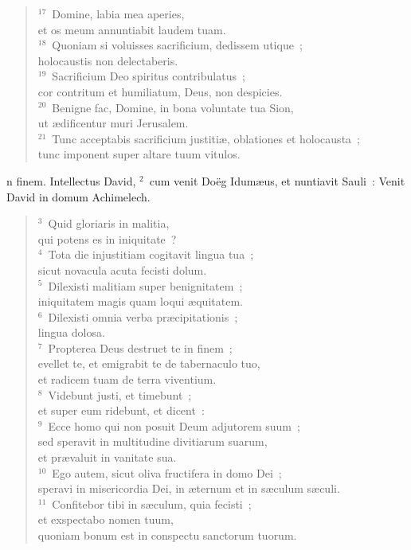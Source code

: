 \begin{verse}
${}^{17}$~Domine, labia mea aperies,\\ et os meum annuntiabit laudem tuam.\\
${}^{18}$~Quoniam si voluisses sacrificium, dedissem utique~;\\ holocaustis non delectaberis.\\
${}^{19}$~Sacrificium Deo spiritus contribulatus~;\\ cor contritum et humiliatum, Deus, non despicies.\\
${}^{20}$~Benigne fac, Domine, in bona voluntate tua Sion,\\ ut \ae dificentur muri Jerusalem.\\
${}^{21}$~Tunc acceptabis sacrificium justiti\ae , oblationes et holocausta~;\\ tunc imponent super altare tuum vitulos.\end{verse}



\bchapter[Psalm]
n finem. Intellectus David,
${}^{2}$~cum venit Do\"eg Idum\ae us, et nuntiavit Sauli~: Venit David in domum Achimelech.
\begin{verse}${}^{3}$~Quid gloriaris in malitia,\\ qui potens es in iniquitate~?\\
${}^{4}$~Tota die injustitiam cogitavit lingua tua~;\\ sicut novacula acuta fecisti dolum.\\
${}^{5}$~Dilexisti malitiam super benignitatem~;\\ iniquitatem magis quam loqui \ae quitatem.\\
${}^{6}$~Dilexisti omnia verba pr\ae cipitationis~;\\ lingua dolosa.\\
${}^{7}$~Propterea Deus destruet te in finem~;\\ evellet te, et emigrabit te de tabernaculo tuo,\\ et radicem tuam de terra viventium.\\
${}^{8}$~Videbunt justi, et timebunt~;\\ et super eum ridebunt, et dicent~:\\
${}^{9}$~Ecce homo qui non posuit Deum adjutorem suum~;\\ sed speravit in multitudine divitiarum suarum,\\ et pr\ae valuit in vanitate sua.\\
${}^{10}$~Ego autem, sicut oliva fructifera in domo Dei~;\\ speravi in misericordia Dei, in \ae ternum et in s\ae culum s\ae culi.\\
${}^{11}$~Confitebor tibi in s\ae culum, quia fecisti~;\\ et exspectabo nomen tuum,\\ quoniam bonum est in conspectu sanctorum tuorum.\end{verse}



